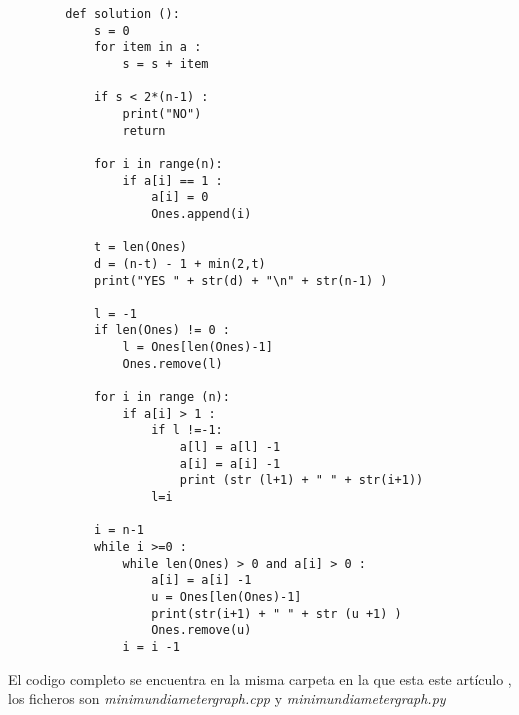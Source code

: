 \documentclass[10pt]{article}
\begin{document}
    \begin{verbatim}
        def solution ():
            s = 0 
            for item in a : 
                s = s + item 
            
            if s < 2*(n-1) :
                print("NO")
                return
            
            for i in range(n): 
                if a[i] == 1 :
                    a[i] = 0 
                    Ones.append(i)

            t = len(Ones)
            d = (n-t) - 1 + min(2,t)
            print("YES " + str(d) + "\n" + str(n-1) )

            l = -1 
            if len(Ones) != 0 :  
                l = Ones[len(Ones)-1]
                Ones.remove(l)

            for i in range (n): 
                if a[i] > 1 :
                    if l !=-1:
                        a[l] = a[l] -1 
                        a[i] = a[i] -1 
                        print (str (l+1) + " " + str(i+1))
                    l=i
            
            i = n-1  
            while i >=0 :
                while len(Ones) > 0 and a[i] > 0 :
                    a[i] = a[i] -1 
                    u = Ones[len(Ones)-1]
                    print(str(i+1) + " " + str (u +1) )
                    Ones.remove(u)
                i = i -1 
    \end{verbatim}

    \noindent El codigo completo se encuentra en la misma carpeta en la que esta este art\'iculo , los ficheros son \textit{minimundiametergraph.cpp} y \textit{minimundiametergraph.py}
\end{document}

